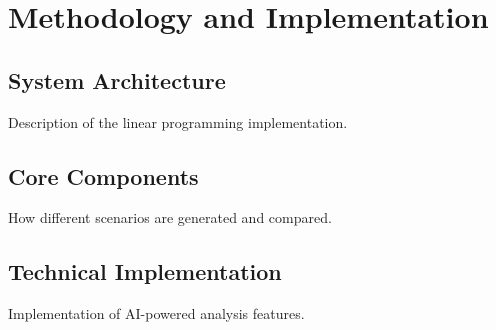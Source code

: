\newpage
\section{Methodology and Implementation}

\subsection{System Architecture}
Description of the linear programming implementation.

\subsection{Core Components}
How different scenarios are generated and compared.

\subsection{Technical Implementation}
Implementation of AI-powered analysis features. 